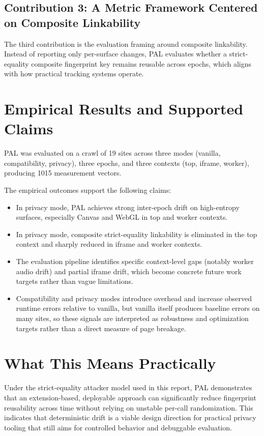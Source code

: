 \documentclass[11pt]{report}
\begin{document}
\subsection{Contribution 3: A Metric Framework Centered on Composite Linkability}

The third contribution is the evaluation framing around composite linkability. Instead of reporting only per-surface changes, PAL evaluates whether a strict-equality composite fingerprint key remains reusable across epochs, which aligns with how practical tracking systems operate.

\section{Empirical Results and Supported Claims}

PAL was evaluated on a crawl of 19 sites across three modes (vanilla, compatibility, privacy), three epochs, and three contexts (top, iframe, worker), producing 1015 measurement vectors.

The empirical outcomes support the following claims:

\begin{itemize}
    \item In privacy mode, PAL achieves strong inter-epoch drift on high-entropy surfaces, especially Canvas and WebGL in top and worker contexts.
    \item In privacy mode, composite strict-equality linkability is eliminated in the top context and sharply reduced in iframe and worker contexts.
    \item The evaluation pipeline identifies specific context-level gaps (notably worker audio drift) and partial iframe drift, which become concrete future work targets rather than vague limitations.
    \item Compatibility and privacy modes introduce overhead and increase observed runtime errors relative to vanilla, but vanilla itself produces baseline errors on many sites, so these signals are interpreted as robustness and optimization targets rather than a direct measure of page breakage.
\end{itemize}

\section{What This Means Practically}

Under the strict-equality attacker model used in this report, PAL demonstrates that an extension-based, deployable approach can significantly reduce fingerprint reusability across time without relying on unstable per-call randomization. This indicates that deterministic drift is a viable design direction for practical privacy tooling that still aims for controlled behavior and debuggable evaluation.
\end{document}
